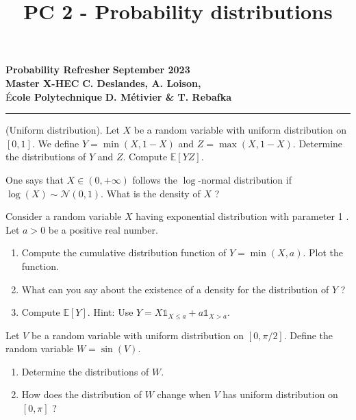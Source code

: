 \documentclass{article}
\title{PC 2 - Probability distributions}
\author{}
\date{}
\begin{document}
\begin{flushleft}
  \textbf{Probability Refresher} \hfill \textbf{September 2023} \\
  \textbf{Master X-HEC} \hfill \textbf{C. Deslandes, A. Loison,} \\
  É\textbf{cole Polytechnique} \hfill \textbf{D. Métivier \& T. Rebafka}
\end{flushleft}

{\let\newpage\relax\maketitle}
\vspace{-1.3cm}
\hrule

\vspace{0.5cm}

    

 \begin{Exercise} (Uniform distribution). Let $X$ be a random variable with uniform distribution on $[0,1]$. We define $Y=\min (X, 1-X)$ and $Z=\max (X, 1-X)$. Determine the distributions of $Y$ and $Z$. Compute $\mathbb{E}[Y Z]$.

\end{Exercise} \begin{Exercise} One says that $X \in(0,+\infty)$ follows the $\log$-normal distribution if $\log (X) \sim \mathcal{N}(0,1)$. What is the density of $X$ ?

\end{Exercise} \begin{Exercise} Consider a random variable $X$ having exponential distribution with parameter 1 . Let $a>0$ be a positive real number.

\begin{enumerate}
  \item Compute the cumulative distribution function of $Y=\min (X, a)$. Plot the function.

  \item What can you say about the existence of a density for the distribution of $Y$ ?

  \item Compute $\mathbb{E}[Y]$. Hint: Use $Y=X \mathbb{1}_{X \leq a}+a \mathbb{1}_{X>a}$.

\end{enumerate}

\end{Exercise} 

\begin{Exercise} Let $V$ be a random variable with uniform distribution on $[0, \pi / 2]$. Define the random variable $W=\sin (V)$.

\begin{enumerate}
  \item Determine the distributions of $W$.

  \item How does the distribution of $W$ change when $V$ has uniform distribution on $[0, \pi]$ ?

\end{enumerate}

\end{Exercise} 
\end{document}
